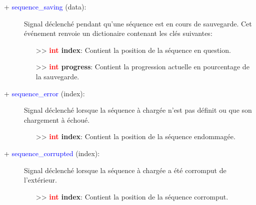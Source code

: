 \documentclass[a4paper, 11pt]{article}
\begin{document}
	\begin{description}
		\item [+ \textcolor{blue}{sequence\_saving} (data):] Signal déclenché pendant qu'une séquence est 
		en cours de sauvegarde. Cet événement renvoie un dictionaire contenant les clés suivantes:
		\begin{itemize}
			\item [>> \textbf{\textcolor{red}{int} index}:] Contient la position de la séquence en question.
			\item [>> \textbf{\textcolor{red}{int} progress}:] Contient la progression actuelle en
			pourcentage de la sauvegarde.\\
		\end{itemize}
	\end{description}
	\begin{description}
		\item [+ \textcolor{blue}{sequence\_error} (index):] Signal déclenché lorsque la séquence à chargée
		n'est pas définit ou que son chargement à échoué.
		\begin{itemize}
			\item [>> \textbf{\textcolor{red}{int} index}:] Contient la position de la séquence endommagée.
			\\
		\end{itemize}
	\end{description}
	\begin{description}
		\item [+ \textcolor{blue}{sequence\_corrupted} (index):] Signal déclenché lorsque la séquence à
		chargée a été corromput de l'extérieur.
		\begin{itemize}
			\item [>> \textbf{\textcolor{red}{int} index}:] Contient la position de la séquence corromput.
		\end{itemize}
	\end{description}
\end{document}
